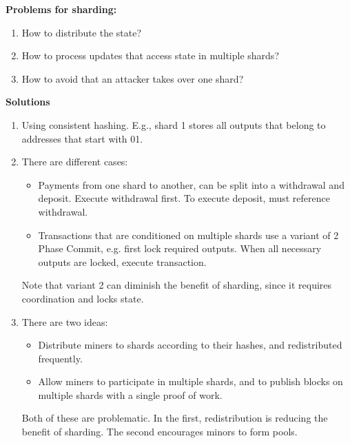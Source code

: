 \begin{note} \textbf{Problems for sharding:}
	\begin{enumerate}[label=\Alph*)]
		\item How to distribute the state?
		\item How to process updates that access state in multiple shards?
		\item How to avoid that an attacker takes over one shard?
	\end{enumerate}

\textbf{Solutions}
\begin{enumerate}[label=\Alph*)]
	\item Using consistent hashing. E.g., shard 1 stores all outputs that belong to addresses that start with 01.
	\item There are different cases:
	\begin{itemize}
		\item Payments from one shard to another, can be split into a withdrawal and deposit. Execute withdrawal first. To execute deposit, must reference withdrawal.
		\item Transactions that are conditioned on multiple shards use a variant of 2 Phase Commit, e.g. first lock required outputs. When all necessary outputs are locked, execute transaction.
	\end{itemize}
	Note that variant 2 can diminish the benefit of sharding, since it requires coordination and locks state.
	\item There are two ideas:
	\begin{itemize}
		\item Distribute miners to shards according to their hashes, and redistributed frequently.
		\item Allow miners to participate in multiple shards, and to publish blocks on multiple shards with a single proof of work. 
		
	\end{itemize}
	Both of these are problematic. In the first, redistribution is reducing the benefit of sharding. The second encourages minors to form pools.
\end{enumerate}

\end{note}